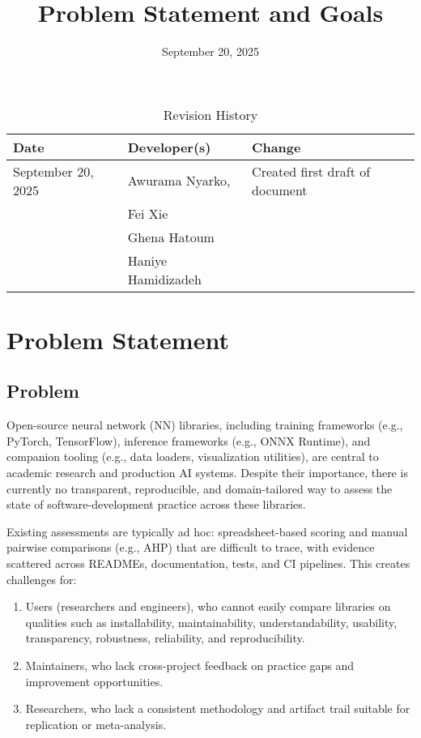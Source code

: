 \documentclass{article}
\title{Problem Statement and Goals\\\progname}
\author{\authname}
\date{September 20, 2025}
\begin{document}
\maketitle

\begin{table}[hp]
\caption{Revision History} \label{TblRevisionHistory}
\begin{tabularx}{\textwidth}{llX}
\toprule
\textbf{Date} & \textbf{Developer(s)} & \textbf{Change}\\
\midrule
September 20, 2025 & Awurama Nyarko, & Created first draft of document
 \\ & Fei Xie &
 \\ &Ghena Hatoum &
 \\ &Haniye Hamidizadeh &
 \\
\bottomrule
\end{tabularx}
\end{table}

\section{Problem Statement}



\subsection{Problem}
Open-source neural network (NN) libraries, including training frameworks
(e.g., PyTorch, TensorFlow), inference frameworks (e.g., ONNX Runtime),
and companion tooling (e.g., data loaders, visualization utilities), are central
to academic research and production AI systems. Despite their importance,
there is currently no transparent, reproducible, and domain-tailored way to
assess the state of software-development practice across these libraries.

Existing assessments are typically ad hoc: spreadsheet-based scoring and
manual pairwise comparisons (e.g., AHP) that are difficult to trace, with
evidence scattered across READMEs, documentation, tests, and CI
pipelines. This creates challenges for:

\begin{enumerate}
  \item Users (researchers and engineers), who cannot easily compare libraries 
  on qualities such as installability, maintainability, understandability, usability, 
  transparency, robustness, reliability, and reproducibility.
  
  \item Maintainers, who lack cross-project feedback on practice gaps and 
  improvement opportunities.
  
  \item Researchers, who lack a consistent methodology and artifact trail 
  suitable for replication or meta-analysis.
\end{enumerate}
\end{document}
